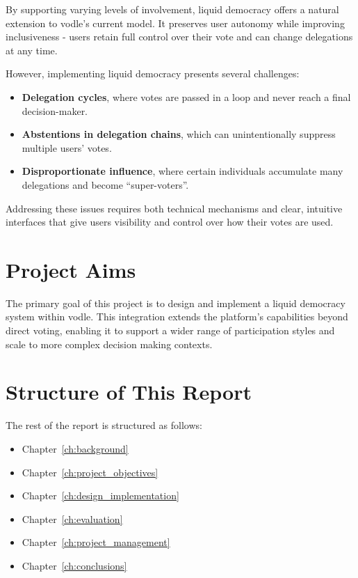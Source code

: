 By supporting varying levels of involvement, liquid democracy offers a natural extension to vodle's current model. It preserves user autonomy while improving inclusiveness - users retain full control over their vote and can change delegations at any time.

However, implementing liquid democracy presents several challenges:
\begin{itemize}
  \item \textbf{Delegation cycles}, where votes are passed in a loop and never reach a final decision-maker.
  \item \textbf{Abstentions in delegation chains}, which can unintentionally suppress multiple users' votes.
  \item \textbf{Disproportionate influence}, where certain individuals accumulate many delegations and become ``super-voters''.
\end{itemize}

Addressing these issues requires both technical mechanisms and clear, intuitive interfaces that give users visibility and control over how their votes are used.

\section{Project Aims}

The primary goal of this project is to design and implement a liquid democracy system within vodle. This integration extends the platform's capabilities beyond direct voting, enabling it to support a wider range of participation styles and scale to more complex decision making contexts.


\section{Structure of This Report}

The rest of the report is structured as follows:

\begin{itemize}
  \item Chapter~\ref{ch:background}
  \item Chapter~\ref{ch:project_objectives}
  \item Chapter~\ref{ch:design_implementation}
  \item Chapter~\ref{ch:evaluation}
  \item Chapter~\ref{ch:project_management}
  \item Chapter~\ref{ch:conclusions}
\end{itemize}